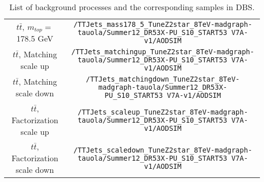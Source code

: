 \begin{sidewaystable}[b]
\begin{tabular}{c|c}
$t\bar{t}$, $m_{top} =$ 178.5 GeV & \verb+/TTJets_mass178_5_TuneZ2star_8TeV-madgraph-tauola/Summer12_DR53X-PU_S10_START53 V7A-v1/AODSIM+ \\
$t\bar{t}$, Matching scale up & \verb+/TTJets_matchingup_TuneZ2star_8TeV-madgraph-tauola/Summer12_DR53X-PU_S10_START53 V7A-v1/AODSIM+ \\
$t\bar{t}$, Matching scale down & \verb+/TTJets_matchingdown_TuneZ2star_8TeV-madgraph-tauola/Summer12_DR53X-PU_S10_START53 V7A-v1/AODSIM+ \\
$t\bar{t}$, Factorization scale up & \verb+/TTJets_scaleup_TuneZ2star_8TeV-madgraph-tauola/Summer12_DR53X-PU_S10_START53 V7A-v1/AODSIM+ \\
$t\bar{t}$, Factorization scale down & \verb+/TTJets_scaledown_TuneZ2star_8TeV-madgraph-tauola/Summer12_DR53X-PU_S10_START53 V7A-v1/AODSIM+ \\

\end{tabular}




\caption{List of background processes and the corresponding samples in DBS.}
\label{appTab:MCSamples}
\end{sidewaystable} 

